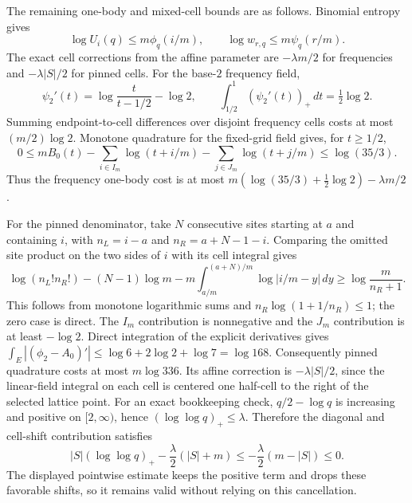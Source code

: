 The remaining one-body and mixed-cell bounds are as follows.  Binomial
entropy gives
\[
 \log U_i(q)\le m\phi_q(i/m),\qquad
 \log w_{r,q}\le m\psi_q(r/m).
\]
The exact cell corrections from the affine parameter are
$-\lambda m/2$ for frequencies and $-\lambda|S|/2$ for pinned cells.
For the base-$2$ frequency field,
\[
 \psi_2'(t)=\log\frac{t}{t-1/2}-\log2,\qquad
 \int_{1/2}^{1}(\psi_2'(t))_+\,dt=\tfrac12\log2.
\]
Summing endpoint-to-cell differences over disjoint frequency cells costs
at most $(m/2)\log2$.  Monotone quadrature for the fixed-grid field gives,
for $t\ge1/2$,
\[
 0\le mB_0(t)-\sum_{i\in I_m}\log(t+i/m)
                    -\sum_{j\in J_m}\log(t+j/m)
 \le\log(35/3).
\]
Thus the frequency one-body cost is at most
$m(\log(35/3)+\tfrac12\log2)-\lambda m/2$.

For the pinned denominator, take $N$ consecutive sites starting at $a$ and
containing $i$, with $n_L=i-a$ and $n_R=a+N-1-i$.  Comparing the omitted
site product on the two sides of $i$ with its cell integral gives
\[
 \log(n_L!n_R!)-(N-1)\log m
 -m\int_{a/m}^{(a+N)/m}\log|i/m-y|\,dy
 \ge\log\frac{m}{n_R+1}.
\]
This follows from monotone logarithmic sums and
$n_R\log(1+1/n_R)\le1$; the zero case is direct.  The $I_m$ contribution
is nonnegative and the $J_m$ contribution is at least $-\log2$.
Direct integration of the explicit derivatives gives
$\int_E| (\phi_2-A_0)'|\le\log6+2\log2+\log7=\log168$.
Consequently pinned quadrature costs at most $m\log336$.  Its affine
correction is $-\lambda|S|/2$, since the linear-field integral on each
cell is centered one half-cell to the right of the selected lattice point.
For an exact bookkeeping check, $q/2-\log q$ is increasing and positive on
$[2,\infty)$, hence $(\log\log q)_+\le\lambda$.  Therefore the diagonal
and cell-shift contribution satisfies
\[
 |S|(\log\log q)_+-\frac\lambda2(|S|+m)
 \le-\frac\lambda2(m-|S|)\le0.
\]
The displayed pointwise estimate keeps the positive term and drops these
favorable shifts, so it remains valid without relying on this cancellation.


